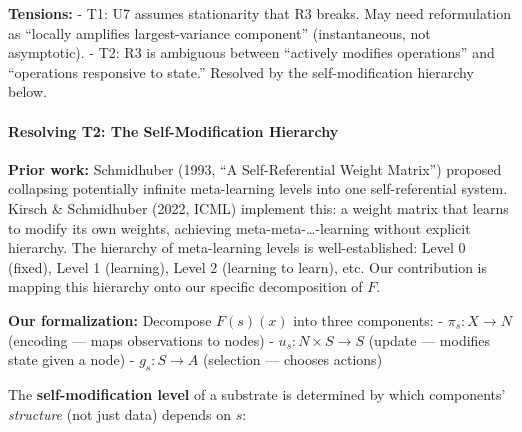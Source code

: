 \documentclass[
  11pt,
]{article}
\begin{document}
\textbf{Tensions:} - T1: U7 assumes stationarity that R3 breaks. May
need reformulation as ``locally amplifies largest-variance component''
(instantaneous, not asymptotic). - T2: R3 is ambiguous between
``actively modifies operations'' and ``operations responsive to state.''
Resolved by the self-modification hierarchy below.

\paragraph{Resolving T2: The Self-Modification
Hierarchy}\label{resolving-t2-the-self-modification-hierarchy}

\textbf{Prior work:} Schmidhuber (1993, ``A Self-Referential Weight
Matrix'') proposed collapsing potentially infinite meta-learning levels
into one self-referential system. Kirsch \& Schmidhuber (2022, ICML)
implement this: a weight matrix that learns to modify its own weights,
achieving meta-meta-\ldots-learning without explicit hierarchy. The
hierarchy of meta-learning levels is well-established: Level 0 (fixed),
Level 1 (learning), Level 2 (learning to learn), etc. Our contribution
is mapping this hierarchy onto our specific decomposition of \(F\).

\textbf{Our formalization:} Decompose \(F(s)(x)\) into three components:
- \(\pi_s: X \to N\) (encoding --- maps observations to nodes) -
\(u_s: N \times S \to S\) (update --- modifies state given a node) -
\(g_s: S \to A\) (selection --- chooses actions)

The \textbf{self-modification level} of a substrate is determined by
which components' \emph{structure} (not just data) depends on \(s\):
\end{document}

